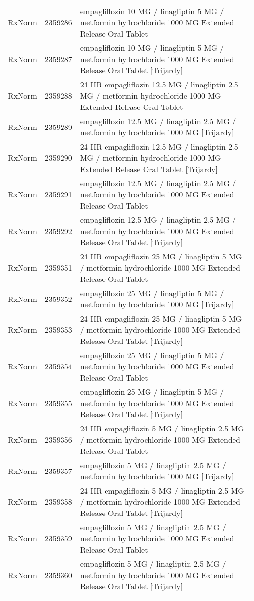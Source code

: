 \begin{longtable}{p{}p{}p{}}
  RxNorm & 2359286 & empagliflozin 10 MG / linagliptin 5 MG / metformin hydrochloride 1000 MG Extended Release Oral Tablet \\ 
  RxNorm & 2359287 & empagliflozin 10 MG / linagliptin 5 MG / metformin hydrochloride 1000 MG Extended Release Oral Tablet [Trijardy] \\ 
  RxNorm & 2359288 & 24 HR empagliflozin 12.5 MG / linagliptin 2.5 MG / metformin hydrochloride 1000 MG Extended Release Oral Tablet \\ 
  RxNorm & 2359289 & empagliflozin 12.5 MG / linagliptin 2.5 MG / metformin hydrochloride 1000 MG [Trijardy] \\ 
  RxNorm & 2359290 & 24 HR empagliflozin 12.5 MG / linagliptin 2.5 MG / metformin hydrochloride 1000 MG Extended Release Oral Tablet [Trijardy] \\ 
  RxNorm & 2359291 & empagliflozin 12.5 MG / linagliptin 2.5 MG / metformin hydrochloride 1000 MG Extended Release Oral Tablet \\ 
  RxNorm & 2359292 & empagliflozin 12.5 MG / linagliptin 2.5 MG / metformin hydrochloride 1000 MG Extended Release Oral Tablet [Trijardy] \\ 
  RxNorm & 2359351 & 24 HR empagliflozin 25 MG / linagliptin 5 MG / metformin hydrochloride 1000 MG Extended Release Oral Tablet \\ 
  RxNorm & 2359352 & empagliflozin 25 MG / linagliptin 5 MG / metformin hydrochloride 1000 MG [Trijardy] \\ 
  RxNorm & 2359353 & 24 HR empagliflozin 25 MG / linagliptin 5 MG / metformin hydrochloride 1000 MG Extended Release Oral Tablet [Trijardy] \\ 
  RxNorm & 2359354 & empagliflozin 25 MG / linagliptin 5 MG / metformin hydrochloride 1000 MG Extended Release Oral Tablet \\ 
  RxNorm & 2359355 & empagliflozin 25 MG / linagliptin 5 MG / metformin hydrochloride 1000 MG Extended Release Oral Tablet [Trijardy] \\ 
  RxNorm & 2359356 & 24 HR empagliflozin 5 MG / linagliptin 2.5 MG / metformin hydrochloride 1000 MG Extended Release Oral Tablet \\ 
  RxNorm & 2359357 & empagliflozin 5 MG / linagliptin 2.5 MG / metformin hydrochloride 1000 MG [Trijardy] \\ 
  RxNorm & 2359358 & 24 HR empagliflozin 5 MG / linagliptin 2.5 MG / metformin hydrochloride 1000 MG Extended Release Oral Tablet [Trijardy] \\ 
  RxNorm & 2359359 & empagliflozin 5 MG / linagliptin 2.5 MG / metformin hydrochloride 1000 MG Extended Release Oral Tablet \\ 
  RxNorm & 2359360 & empagliflozin 5 MG / linagliptin 2.5 MG / metformin hydrochloride 1000 MG Extended Release Oral Tablet [Trijardy] \\ 
  \hline
\label{tab:codes_sodium-glucose-cotransporter-2-inhibitor-medications}
\end{longtable}
